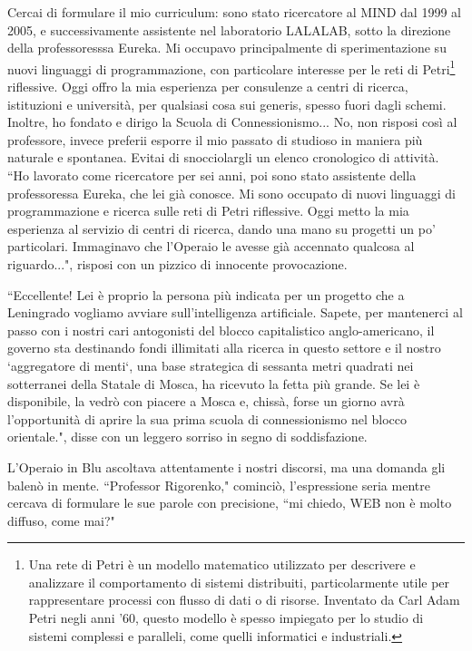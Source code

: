 \documentclass[12pt,b5paper]{article}
\begin{document}
Cercai di formulare il mio curriculum: sono stato ricercatore al MIND dal 1999 al 2005, e successivamente assistente
nel laboratorio LALALAB, sotto la direzione della professoresssa Eureka. Mi
occupavo principalmente di sperimentazione su nuovi linguaggi di
programmazione, con particolare interesse per le reti di Petri\footnote{Una rete di Petri è un modello matematico utilizzato per descrivere e analizzare il comportamento di sistemi distribuiti, particolarmente utile per rappresentare processi con flusso di dati o di risorse. Inventato da Carl Adam Petri negli anni '60, questo modello è spesso impiegato per lo studio di sistemi complessi e paralleli, come quelli informatici e industriali.} riflessive. Oggi
offro la mia esperienza per consulenze a centri di ricerca, istituzioni e
università, per qualsiasi cosa sui generis, spesso fuori dagli schemi. Inoltre, ho fondato e dirigo
la Scuola di Connessionismo... No, non risposi così al professore, invece preferii
esporre il mio passato di studioso in maniera più naturale e spontanea. Evitai
di snocciolargli un elenco cronologico di attività. ``Ho lavorato come ricercatore per
sei anni, poi sono stato assistente della professoressa Eureka, che lei già
conosce. Mi sono occupato di nuovi linguaggi di programmazione e ricerca sulle
reti di Petri riflessive. Oggi metto la mia esperienza al servizio 
di centri di ricerca, dando una mano su progetti un po' particolari.
Immaginavo che l'Operaio le avesse già accennato qualcosa al riguardo...",
risposi con un pizzico di innocente provocazione.

``Eccellente! Lei è proprio la persona più indicata per un progetto che a Leningrado
vogliamo avviare sull'intelligenza artificiale. Sapete, per mantenerci al passo con
i nostri cari antogonisti del blocco capitalistico anglo-americano, il governo sta
destinando fondi illimitati alla ricerca in questo settore e il nostro `aggregatore
di menti`, una base strategica di sessanta metri quadrati nei sotterranei della
Statale di Mosca, ha ricevuto la fetta più grande. Se lei è disponibile, la vedrò
con piacere a Mosca e, chissà, forse un giorno avrà l'opportunità di aprire la sua
prima scuola di connessionismo nel blocco orientale.", disse con un leggero sorriso
in segno di soddisfazione.

L'Operaio in Blu ascoltava attentamente i nostri discorsi, ma una domanda gli
balenò in mente. ``Professor Rigorenko," cominciò, l'espressione seria mentre
cercava di formulare le sue parole con precisione, ``mi chiedo, WEB non è molto
diffuso, come mai?"
\end{document}
